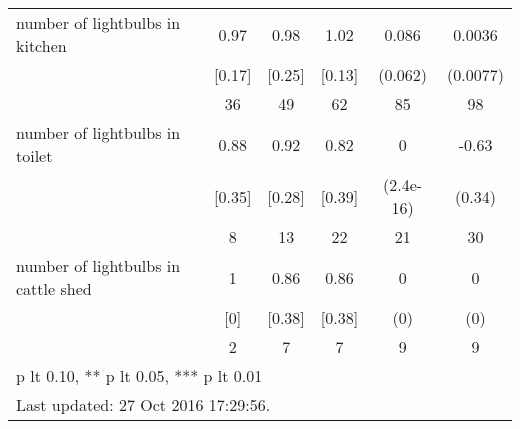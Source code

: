 \begin{table}[htbp]
\begin{tabular*}{0.9\hsize}{@{\hskip\tabcolsep\extracolsep\fill}l*{1}{ccccc}}
number of lightbulbs in kitchen &     0.97&     0.98&     1.02&    0.086         &   0.0036         \\
                                &   [0.17]&   [0.25]&   [0.13]&  (0.062)         & (0.0077)         \\
                                &       36&       49&       62&       85         &       98         \\
number of lightbulbs in toilet  &     0.88&     0.92&     0.82&        0         &    -0.63\sym{*}  \\
                                &   [0.35]&   [0.28]&   [0.39]&(2.4e-16)         &   (0.34)         \\
                                &        8&       13&       22&       21         &       30         \\
number of lightbulbs in cattle shed&        1&     0.86&     0.86&        0         &        0         \\
                                &      [0]&   [0.38]&   [0.38]&      (0)         &      (0)         \\
                                &        2&        7&        7&        9         &        9         \\
\bottomrule
\multicolumn{6}{l}{\footnotesize * p lt 0.10, ** p lt 0.05, *** p lt 0.01}\\
\multicolumn{6}{l}{\footnotesize Last updated: 27 Oct 2016 17:29:56.}\\
\end{tabular*}
\end{table}
